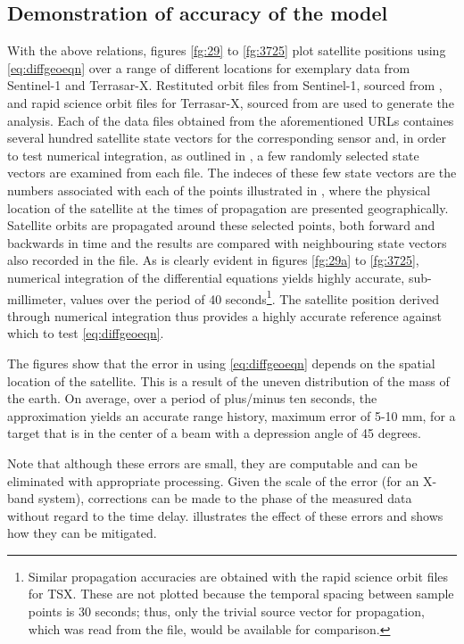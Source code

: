 \subsection{Demonstration of accuracy of the model}
With the above relations, figures \ref{fg:29} to \ref{fg:3725} plot satellite positions using \eqref{eq:diffgeoeqn} over a range of different locations for exemplary data from Sentinel-1 and Terrasar-X. Restituted orbit files from Sentinel-1, sourced from \cite{SentinelPOD}, and rapid science orbit files for Terrasar-X, sourced from \cite{GFZ} are used to generate the analysis. Each of the data files obtained from the aforementioned URLs containes several hundred satellite state vectors for the corresponding sensor and, in order to test numerical integration, as outlined in , a few randomly selected state vectors are examined from each file. The indeces of these few state vectors are the numbers associated with each of the points illustrated in , where the physical location of the satellite at the times of propagation are presented geographically. Satellite orbits are propagated around these selected points, both forward and backwards in time and the results are compared with neighbouring state vectors also recorded in the file. As is clearly evident in figures \ref{fg:29a} to \ref{fg:3725}, numerical integration of the differential equations yields highly accurate, sub-millimeter, values over the period of 40 seconds\footnote{Similar propagation accuracies are obtained with the rapid science orbit files for TSX. These are not plotted because the temporal spacing between sample points is 30 seconds; thus, only the trivial source vector for propagation, which was read from the file, would be available for comparison.}. The satellite position derived through numerical integration thus provides a highly accurate reference against which to test \eqref{eq:diffgeoeqn}. 
\par
The figures show that the error in using \eqref{eq:diffgeoeqn} depends on the spatial location of the satellite. This is a result of the uneven distribution of the mass of the earth. On average, over a period of plus/minus ten seconds, the approximation yields an accurate range history, maximum error of 5-10 mm, for a target that is in the center of a beam with a depression angle of 45 degrees. 
\par
Note that although these errors are small, they are computable and can be eliminated with appropriate processing. Given the scale of the error (for an X-band system), corrections can be made to the phase of the measured data without regard to the time delay.   illustrates the effect of these errors and shows how they can be mitigated.  
